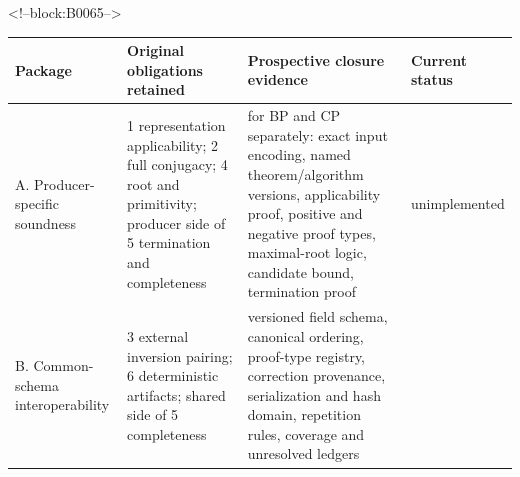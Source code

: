 \documentclass[11pt,a4paper]{article}
\begin{document}
<!--block:B0065-->
\begin{longtable}[]{@{}llll@{}}
\toprule
\begin{minipage}[b]{0.22\columnwidth}\raggedright
Package\strut
\end{minipage} & \begin{minipage}[b]{0.22\columnwidth}\raggedright
Original obligations retained\strut
\end{minipage} & \begin{minipage}[b]{0.22\columnwidth}\raggedright
Prospective closure evidence\strut
\end{minipage} & \begin{minipage}[b]{0.22\columnwidth}\raggedright
Current status\strut
\end{minipage}\tabularnewline
\midrule
\endhead
\begin{minipage}[t]{0.22\columnwidth}\raggedright
A. Producer-specific soundness\strut
\end{minipage} & \begin{minipage}[t]{0.22\columnwidth}\raggedright
1 representation applicability; 2 full conjugacy; 4 root and primitivity; producer side of 5 termination and completeness\strut
\end{minipage} & \begin{minipage}[t]{0.22\columnwidth}\raggedright
for BP and CP separately: exact input encoding, named theorem/algorithm versions, applicability proof, positive and negative proof types, maximal-root logic, candidate bound, termination proof\strut
\end{minipage} & \begin{minipage}[t]{0.22\columnwidth}\raggedright
unimplemented\strut
\end{minipage}\tabularnewline
\begin{minipage}[t]{0.22\columnwidth}\raggedright
B. Common-schema interoperability\strut
\end{minipage} & \begin{minipage}[t]{0.22\columnwidth}\raggedright
3 external inversion pairing; 6 deterministic artifacts; shared side of 5 completeness\strut
\end{minipage} & \begin{minipage}[t]{0.22\columnwidth}\raggedright
versioned field schema, canonical ordering, proof-type registry, correction provenance, serialization and hash domain, repetition rules, coverage and unresolved ledgers\strut
\end{minipage} & \begin{minipage}[t]{0.22\columnwidth}\raggedright

\end{minipage}
\end{longtable}
\end{document}
